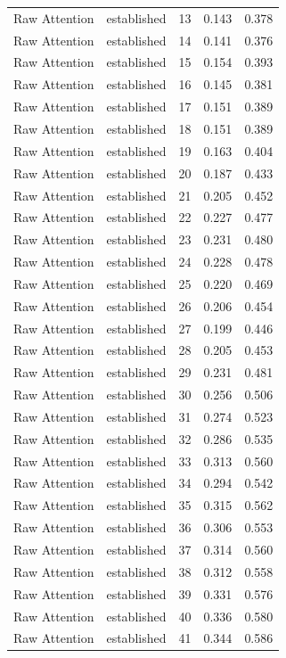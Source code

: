 \begin{tabular}{llrrr}
Raw Attention & established & 13 & 0.143 & 0.378 \\
Raw Attention & established & 14 & 0.141 & 0.376 \\
Raw Attention & established & 15 & 0.154 & 0.393 \\
Raw Attention & established & 16 & 0.145 & 0.381 \\
Raw Attention & established & 17 & 0.151 & 0.389 \\
Raw Attention & established & 18 & 0.151 & 0.389 \\
Raw Attention & established & 19 & 0.163 & 0.404 \\
Raw Attention & established & 20 & 0.187 & 0.433 \\
Raw Attention & established & 21 & 0.205 & 0.452 \\
Raw Attention & established & 22 & 0.227 & 0.477 \\
Raw Attention & established & 23 & 0.231 & 0.480 \\
Raw Attention & established & 24 & 0.228 & 0.478 \\
Raw Attention & established & 25 & 0.220 & 0.469 \\
Raw Attention & established & 26 & 0.206 & 0.454 \\
Raw Attention & established & 27 & 0.199 & 0.446 \\
Raw Attention & established & 28 & 0.205 & 0.453 \\
Raw Attention & established & 29 & 0.231 & 0.481 \\
Raw Attention & established & 30 & 0.256 & 0.506 \\
Raw Attention & established & 31 & 0.274 & 0.523 \\
Raw Attention & established & 32 & 0.286 & 0.535 \\
Raw Attention & established & 33 & 0.313 & 0.560 \\
Raw Attention & established & 34 & 0.294 & 0.542 \\
Raw Attention & established & 35 & 0.315 & 0.562 \\
Raw Attention & established & 36 & 0.306 & 0.553 \\
Raw Attention & established & 37 & 0.314 & 0.560 \\
Raw Attention & established & 38 & 0.312 & 0.558 \\
Raw Attention & established & 39 & 0.331 & 0.576 \\
Raw Attention & established & 40 & 0.336 & 0.580 \\
Raw Attention & established & 41 & 0.344 & 0.586 \\

\end{tabular}
